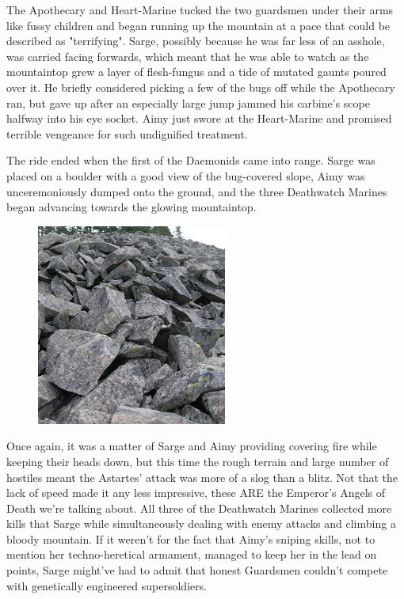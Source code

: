 The Apothecary and Heart-Marine tucked the two guardsmen under their arms like fussy children and began running up the mountain at a pace that could be described as "terrifying". 
Sarge, possibly because he was far less of an asshole, was carried facing forwards, which meant that he was able to watch as the mountaintop grew a layer of flesh-fungus and a tide of mutated gaunts poured over it. 
He briefly considered picking a few of the bugs off while the Apothecary ran, but gave up after an especially large jump jammed his carbine's scope halfway into his eye socket. 
Aimy just swore at the Heart-Marine and promised terrible vengeance for such undignified treatment.

The ride ended when the first of the Daemonids came into range. 
Sarge was placed on a boulder with a good view of the bug-covered slope, Aimy was unceremoniously dumped onto the ground, and the three Deathwatch Marines began advancing towards the glowing mountaintop.

\begin{figure}
	\begin{center}
		\includegraphics[width=\figwidth]{pics/16/48.png}
	\end{center}
\end{figure}
Once again, it was a matter of Sarge and Aimy providing covering fire while keeping their heads down, but this time the rough terrain and large number of hostiles meant the Astartes' attack was more of a slog than a blitz. 
Not that the lack of speed made it any less impressive, these ARE the Emperor's Angels of Death we're talking about. 
All three of the Deathwatch Marines collected more kills that Sarge while simultaneously dealing with enemy attacks and climbing a bloody mountain. 
If it weren't for the fact that Aimy's sniping skills, not to mention her techno-heretical armament, managed to keep her in the lead on points, Sarge might've had to admit that honest Guardsmen couldn't compete with genetically engineered supersoldiers.

